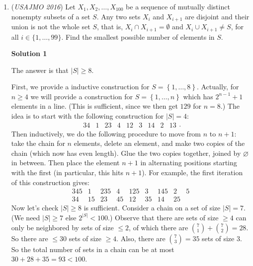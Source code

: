 \begin{enumerate}
 
 \[5^{n-20} \mod 2^{20} < \frac{2^{14}}{5^6}\]

 \[5^{n-20} \mod 2^{20} \leq 1\]

 \[5^{n-20} \mod 2^{20} = 1\]

 From this, Euler's Theorem comes to mind and we see that if $n-20 = \varphi\left(2^{20}\right)$, the equality is satisfied. Thus, we get that $n = 20 + 2^{19}$, which is less than $10^6$, and we should be done. However, this requires slightly more formalization, and can be proven directly more easily if $n = 20+2^{19}$ is known or suspected. 

 


	\item (\textit{USAJMO 2016}) Let $X_1, X_2, \ldots, X_{100}$ be a sequence of mutually distinct nonempty subsets of a set $S$. Any two sets $X_i$ and $X_{i+1}$ are disjoint and their union is not the whole set $S$, that is, $X_i\cap X_{i+1}=\emptyset$ and $X_i\cup X_{i+1}\neq S$, for all $i\in\{1, \ldots, 99\}$. Find the smallest possible number of elements in $S$.


 



\textbf{Solution 1}

The answer is that $|S| \ge 8$.

 First, we provide a inductive construction for $S = \left\{ 1, \dots, 8 \right\}$. Actually, for $n \ge 4$ we will provide a construction for $S = \left\{ 1, \dots, n \right\}$ which has $2^{n-1} + 1$ elements in a line. (This is sufficient, since we then get $129$ for $n = 8$.) The idea is to start with the following construction for $|S| = 4$: 
 \[\begin{array}{ccccccccc} 34 & 1 & 23 & 4 & 12 & 3 & 14 & 2 & 13 \end{array}.\]Then inductively, we do the following procedure to move from $n$ to $n+1$: take the chain for $n$ elements, delete an element, and make two copies of the chain (which now has even length). Glue the two copies together, joined by $\varnothing$ in between. Then place the element $n+1$ in alternating positions starting with the first (in particular, this hits $n+1$). For example, the first iteration of this construction gives: 
 \[\begin{array}{ccccccccc} 345 & 1 & 235 & 4 & 125 & 3 & 145 & 2 & 5 \\ 34 & 15 & 23 & 45 & 12 & 35 & 14 & 25 & \end{array}\]Now let's check $|S| \ge 8$ is sufficient. Consider a chain on a set of size $|S| = 7$. (We need $|S| \ge 7$ else $2^{|S|} < 100$.) Observe that there are sets of size $\ge 4$ can only be neighbored by sets of size $\le 2$, of which there are $\binom 71 + \binom 72 = 28$. So there are $\le 30$ sets of size $\ge 4$. Also, there are $\binom 73 = 35$ sets of size $3$. So the total number of sets in a chain can be at most $30 + 28 + 35 = 93 < 100$.


\end{enumerate}
